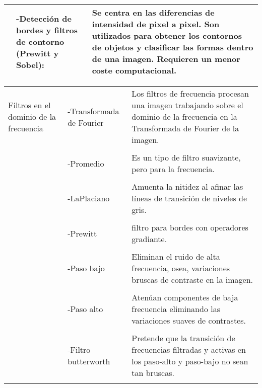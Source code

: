 \documentclass[letterpaper]{article}
\begin{document}
\begin{table}[H]
\begin{tabular}[13cm]{ 
    >{\centering\arraybackslash}m{3cm} 
    >{}m{5cm} 
    >{}m{5cm}}
         & -Detección de bordes y filtros de contorno (Prewitt y Sobel): & Se centra en las diferencias de intensidad de pixel a pixel. Son utilizados para obtener los contornos de objetos y clasificar las formas dentro de una imagen. Requieren un menor coste computacional. \\ 
         
         \bottomrule
        
	\end{tabular}
    
\end{table}

\begin{table}[H]

	\centering
    
	\begin{tabular}[10cm]{ 
    >{\centering\arraybackslash}m{3cm} 
    >{}m{5cm} 
    >{}m{5cm}}
        
        
        \midrule
        
         Filtros en el dominio de la frecuencia 
         
         & -Transformada de Fourier & Los filtros de frecuencia procesan una imagen trabajando sobre el dominio de la frecuencia en la Transformada de Fourier de la imagen. \\ \\
         & -Promedio & Es un tipo de filtro suavizante, pero para la frecuencia. \\ \\
         & -LaPlaciano & Amuenta la nitidez al afinar las líneas de transición de niveles de gris. \\ \\
         & -Prewitt & filtro para bordes con operadores gradiante. \\ \\
         & -Paso bajo & Eliminan el ruido de alta frecuencia, osea, variaciones bruscas de contraste en la imagen.\\ \\
         & -Paso alto & Atenúan componentes de baja frecuencia eliminando las variaciones suaves de contrastes.\\ \\
         & -Filtro butterworth & Pretende que la transición de frecuencias filtradas y activas en los paso-alto y paso-bajo no sean tan bruscas.\\ \\
        
        \midrule
        

\end{tabular}
\end{table}
\end{document}

